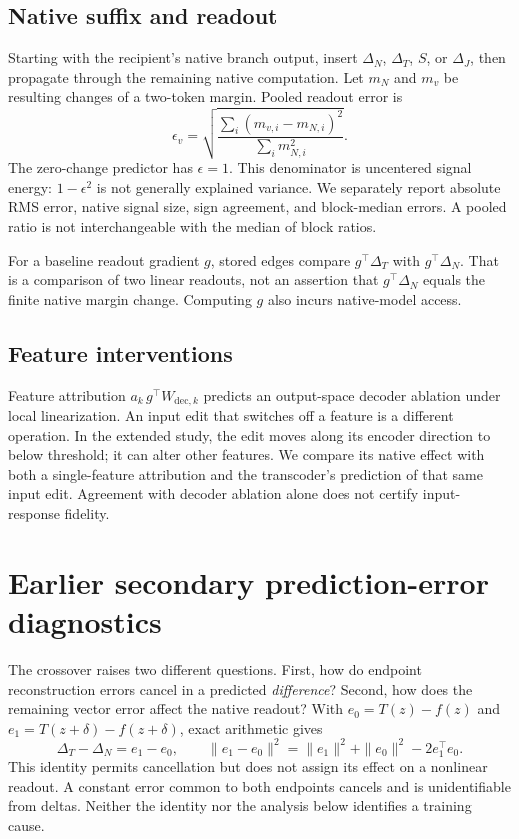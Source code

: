 \subsection{Native suffix and readout}
Starting with the recipient's native branch output, insert $\Delta_N$, $\Delta_T$, $S$, or $\Delta_J$, then propagate through the remaining native computation. Let $m_N$ and $m_v$ be resulting changes of a two-token margin. Pooled readout error is
\begin{equation}
 \epsilon_v=\sqrt{\frac{\sum_i(m_{v,i}-m_{N,i})^2}{\sum_i m_{N,i}^2}}.
\end{equation}
The zero-change predictor has $\epsilon=1$. This denominator is uncentered signal energy: $1-\epsilon^2$ is not generally explained variance. We separately report absolute RMS error, native signal size, sign agreement, and block-median errors. A pooled ratio is not interchangeable with the median of block ratios.

For a baseline readout gradient $g$, stored edges compare $g^\top\Delta_T$ with $g^\top\Delta_N$. That is a comparison of two linear readouts, not an assertion that $g^\top\Delta_N$ equals the finite native margin change. Computing $g$ also incurs native-model access.

\subsection{Feature interventions}
Feature attribution $a_k\,g^\top W_{\mathrm{dec},k}$ predicts an output-space decoder ablation under local linearization. An input edit that switches off a feature is a different operation. In the extended study, the edit moves along its encoder direction to below threshold; it can alter other features. We compare its native effect with both a single-feature attribution and the transcoder's prediction of that same input edit. Agreement with decoder ablation alone does not certify input-response fidelity.

\section{Earlier secondary prediction-error diagnostics}\label{app:earlierdiagnostics}
The crossover raises two different questions. First, how do endpoint reconstruction errors cancel in a predicted \emph{difference}? Second, how does the remaining vector error affect the native readout? With $e_0=T(z)-f(z)$ and $e_1=T(z+\delta)-f(z+\delta)$, exact arithmetic gives
\[
 \Delta_T-\Delta_N=e_1-e_0,\qquad
 \|e_1-e_0\|^2=\|e_1\|^2+\|e_0\|^2-2e_1^\top e_0.
\]
This identity permits cancellation but does not assign its effect on a nonlinear readout. A constant error common to both endpoints cancels and is unidentifiable from deltas. Neither the identity nor the analysis below identifies a training cause.

